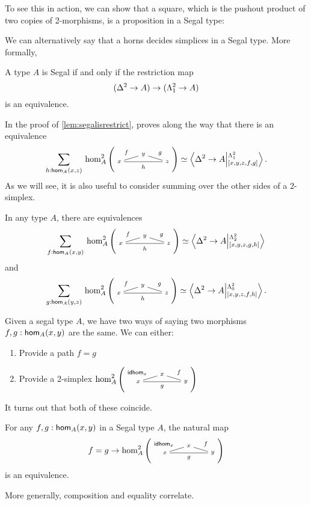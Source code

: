 \documentclass[main.tex]{subfiles}
\begin{document}
To see this in action, we can show that a square, which
is the pushout product of two copies of 2-morphisms, is a proposition in a Segal type:
\begin{lemma}

\end{lemma}
We can alternatively say that a horns
decides simplices in a Segal type. More formally,

\begin{lemma}
\label{lem:segalisrestrict}
A type $A$ is Segal if and only if the restriction map
$$
(\tsx \to A) \to (\tohorn \to A) 
$$
is an equivalence. 
\end{lemma}
In the proof of \ref{lem:segalisrestrict}, \cite{riehl_type_2017} proves along the way that there is an equivalence
\begin{equation}
    \sm{h : \ho[A]{x}{z}}\homtwo{A}(x,y,z,f,g,h) \simeq \ndexten{\tsx}{A}{\tohorn}{[x,y,z,f,g]}.
\end{equation}
As we will see, it is also useful to consider summing over the other sides of a 2-simplex.
\begin{corollary}
    In any type $A$, there are equivalences
    \begin{equation}
        \label{rem:sumoverfistt}
    \sm{f : \ho[A]{x}{y}}\homtwo{A}(x,y,z,f,g,h) \simeq \ndexten{\tsx}{A}{\tthorn}{[x,y,z,g,h]}
    \end{equation}
    and
    \begin{equation}
    \sm{g : \ho[A]{y}{z}}\homtwo{A}(x,y,z,f,g,h) \simeq \ndexten{\tsx}{A}{\tzhorn}{[x,y,z,f,h]}.
    \end{equation}
\end{corollary}
Given a segal type $A$, we have two ways of saying two morphisms $f,g : \ho[A]{x}{y}$ are the same. We can either:
\begin{enumerate}
    \item Provide a path $f = g$
    \item Provide a 2-simplex $\homtwo{A}(x,x,y,\idhom{x},f,g)$
\end{enumerate}
It turns out that both of these coincide.
\begin{lemma}
    \label{lem:pathis2mor}
    For any $f,g : \ho[A]{x}{y}$ in a Segal type $A$, the natural map
    $$f = g \to \homtwo{A}(x,x,y, \idhom{x}, f,g)$$
    is an equivalence.
\end{lemma}
More generally, composition and equality correlate.
\end{document}
